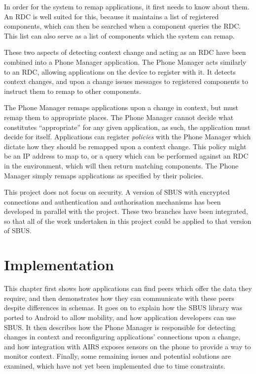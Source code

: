 \documentclass[12pt,twoside,notitlepage]{report}
\begin{document}
In order for the system to remap applications, it first needs to know about them. 
An RDC is well suited for this, because it maintains a list of registered components, which can then be searched when a component queries the RDC. 
This list can also serve as a list of components which the system can remap.

These two aspects of detecting context change and acting as an RDC have been combined into a Phone Manager application. 
The Phone Manager acts similarly to an RDC, allowing applications on the device to register with it. 
It detects context changes, and upon a change issues messages to registered components to instruct them to remap to other components.

The Phone Manager remaps applications upon a change in context, but must remap them to appropriate places. 
The Phone Manager cannot decide what constitutes ``appropriate'' for any given application, as such, the application must decide for itself. 
Applications can register {\sl policies} with the Phone Manager which dictate how they should be remapped upon a context change. 
This policy might be an IP address to map to, or a query which can be performed against an RDC in the environment, which will then return matching components. 
The Phone Manager simply remaps applications as specified by their policies.

This project does not focus on security. 
A version of SBUS with encrypted connections and authentication and authorisation mechanisms has been developed in parallel with the project. 
These two branches have been integrated, so that all of the work undertaken in this project could be applied to that version of SBUS.

\cleardoublepage


\chapter{Implementation}

This chapter first shows how applications can find peers which offer the data they require, and then demonstrates how they can communicate with these peers despite differences in schemas. 
It goes on to explain how the SBUS library was ported to Android to allow mobility, and how application developers can use SBUS. 
It then describes how the Phone Manager is responsible for detecting changes in context and reconfiguring applications' connections upon a change, and how integration with AIRS exposes sensors on the phone to provide a way to monitor context. 
Finally, some remaining issues and potential solutions are examined, which have not yet been implemented due to time constraints. 
\end{document}
